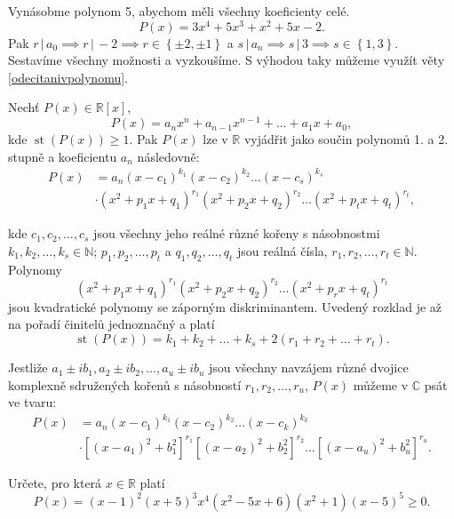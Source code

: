 \begin{reseni}
Vynásobme polynom 5, abychom měli všechny koeficienty celé.
$$P(x) = 3x^4+5x^3+x^2+5x-2.$$
Pak $r \, | \, a_0 \implies r\, | \, -2 \implies r \in \left \{ \pm 2, \pm 1 \right \} $
a $s \, | \, a_n\implies s \, | \, 3 \implies s \in \left \{ 1, 3 \right \} $.
Sestavíme všechny možnosti a vyzkoušíme. S výhodou taky můžeme využít věty
\ref{odecitanivpolynomu}.
\end{reseni}


\begin{veta}
  Nechť $P(x) \in \mathbb R [x]$,
  $$P(x) = a_n x^n + a_{n-1} x^{n-1} + \dots + a_1 x + a_0,$$
  kde $\operatorname{st}(P(x)) \geq 1$. Pak $P(x)$ lze v $\mathbb R$ vyjádřit jako součin polynomů 1. a 2. stupně a koeficientu $a_n$ následovně:
  \begin{align*}
    P(x) & = a_n(x-c_1)^{k_1}(x-c_2)^{k_2} \dots (x-c_s)^{k_s}\\
    & \cdot (x^2+p_1 x + q_1)^{r_1}(x^2+p_2 x + q_2)^{r_2} \dots (x^2+p_t x + q_t)^{r_t},
  \end{align*}


  kde $c_1,c_2, \dots, c_s$ jsou všechny jeho reálné různé kořeny s násobnostmi $k_1, k_2, \dots, k_s \in \mathbb N$;
  $p_1, p_2, \dots, p_t$ a $q_1, q_2, \dots, q_t$ jsou reálná čísla, $r_1, r_2, \dots, r_t \in \mathbb N$.
  Polynomy
  $$(x^2+p_1 x + q_1)^{r_1}(x^2+p_2 x + q_2)^{r_2} \dots (x^2+p_r x + q_t)^{r_t}$$
  jsou kvadratické polynomy se záporným diskriminantem. Uvedený rozklad je až na pořadí činitelů
  jednoznačný a platí
  $$\operatorname{st}(P(x)) = k_1 + k_2 + \dots + k_s + 2(r_1 + r_2 + \dots + r_t).$$

  Jestliže $a_1 \pm ib_1, a_2 \pm ib_2, \dots, a_u \pm ib_u$ jsou všechny navzájem různé
  dvojice komplexně sdružených kořenů s násobností $r_1, r_2, \dots, r_u$, $P(x)$ můžeme v $\mathbb C$ psát ve tvaru:
  \begin{align*}
    P(x) & = a_n(x-c_1)^{k_1}(x-c_2)^{k_2} \dots (x-c_k)^{k_k}\\
    & \cdot  \left [(x-a_1)^2+b_1^2\right ]^{r_1}\left [(x-a_2)^2+b_2^2\right]^{r_2} \dots \left [(x-a_u)^2+b_u^2\right ]^{r_u}.
  \end{align*}
\end{veta}

\begin{priklad}
    Určete, pro která $x \in \mathbb R$ platí
    $$P(x)=(x-1)^2(x+5)^3x^4(x^2-5x+6)(x^2+1)(x-5)^5 \geq 0.$$
\end{priklad}

